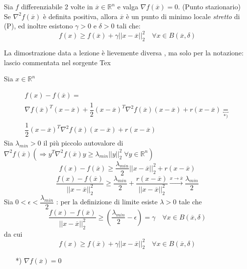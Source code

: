 \begin{theo}
\label{theo:punto-stazionario-minimo-locale}
Sia $f$ differenziabile 2 volte in $\overline{x} \in \mathbb{R}^{n}$ e valga
$\nabla f(\overline{x})=0$. (Punto stazionario) \\
 Se $\nabla^{2}f(\overline{x})$ è definita positiva,
allora $\overline{x}$ è un punto di minimo locale \emph{stretto} di (P), ed inoltre
esistono $\gamma > 0$ e $\delta >0$ tali che:
$$ f(x) \geq f(\overline{x}) + \gamma || x- \overline{x} ||^{2}_{2} \quad \forall x \in B(\overline{x}, \delta)$$
\end{theo}
\begin{thproof}
\begin{notes}
La dimostrazione data a lezione \`e lievemente diversa
, ma solo per la notazione: lascio commentata nel sorgente
Tex
\end{notes}
Sia $x \in \mathbb{R}^{n}$

$$
\begin{array}{l}
 f(x) - f(\overline{x}) = \\
 \nabla
f(\overline{x})^{T}(x - \overline{x}) +
\dfrac{1}{2}(x-\overline{x})^{T}
\nabla^{2}f(\overline{x})(x - \overline{x})
+ r(x - \overline{x}) \underbracket{ = }_{*)}
 \\
\dfrac{1}{2}(x-\overline{x})^{T}
\nabla^{2}f(\overline{x})(x - \overline{x})
+ r(x - \overline{x})
\end{array}
$$
Sia $\lambda_{min}>0$ il pi\`u piccolo autovalore di
$\nabla^{2}f(\overline{x}) 
(\Rightarrow y^{T} \nabla^{2}f(\overline{x})y \geq
\lambda_{min} ||y||_{2}^{2} \; \forall y \in \mathbb{R}^{n}
)$ 
$$f(x) - f(\overline{x}) \geq \dfrac{\lambda_{min}}{2}
|| x - \overline{x} ||_{2}^{2} + r(x - \overline{x}) 
 $$
$$
\dfrac{f(x)-f(\overline{x})}{||x - \overline{x}||_{2}^{2}}
\geq \dfrac{\lambda_{min}}{2}
 + \dfrac{r(x - \overline{x})}{|| x - \overline{x} ||_{2}^{2}}
\xrightarrow{x \to \overline{x}} \dfrac{\lambda_{min}}{2}
 $$
Sia $0 < \epsilon < \dfrac{\lambda_{min}}{2}$ :
per la definizione di limite esiste $\lambda > 0$ tale che
$$
\dfrac{f(x) - f(\overline{x})}{||x - \overline{x}||_{2}^{2}}
\geq (\dfrac{\lambda_{min}}{2} - \epsilon) = \gamma
\quad \forall x \in B(\overline{x},\delta)
$$
da cui
$$ f(x) \geq f(\overline{x}) + \gamma || x - \overline{x}||_{2}^{2} \quad \forall x \in B(\overline{x},\delta)$$
\begin{itemize}
\item[*)] $\nabla f(\overline{x})=0$
\end{itemize}


\end{thproof}
